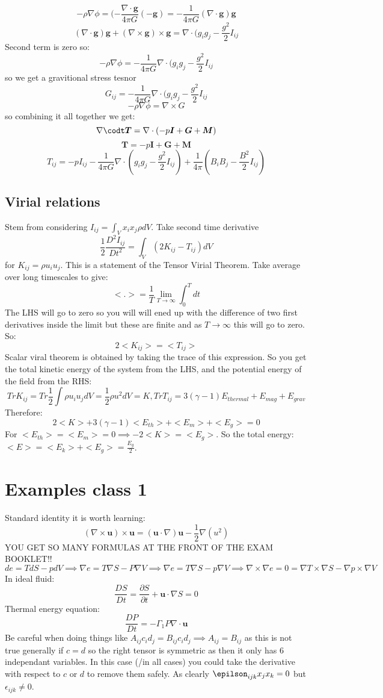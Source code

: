 \documentclass{article}
\begin{document}
$$
-\rho \nabla \phi = (- \frac{\nabla \cdot \bm g}{4 \pi G} (- \bm g) = -\frac{1}{4\pi G} (\nabla \cdot \bm g) \bm g
$$
$$
(\nabla \cdot \bm g) \bm g + (\nabla \times \bm g )\times \bm g = \nabla \cdot (g_i g_j - \frac{g^2}{2} I_{ij}
$$
Second term is zero so:
$$
- \rho \nabla \phi = - \frac{1}{4\pi G} \nabla \cdot(g_i g_j - \frac{g^2}{2} I_{ij} 
$$
so we get a gravitional stress tesnor
$$
G_{ij} = - \frac{1}{4\pi G} \nabla \cdot(g_i g_j - \frac{g^2}{2} I_{ij} 
$$
$$
-\rho \nabla \phi = \nabla \times G
$$
so combining it all together we get:
$$
\nabla \codt \bm T = \nabla \cdot (- p \bm I + \bm G + \bm M)
$$
$$
\bm T = - p \bm I + \bm G + \bm M
$$
\begin{equation}
        T_{ij} = -p I_{ij} -\frac{1}{4\pi G} \nabla \cdot(g_i g_j - \frac{g^2}{2} I_{ij})  + \frac{1}{4 \pi} (B_i B_j - \frac{B^2}{2} I_{ij})
\end{equation}
\subsection{Virial relations}
Stem from considering $I_{ij} = \int_V x_i x_j \rho dV$. Take second time derivative
$$
\frac{1}{2}\frac{D^2 I_{ij}}{Dt^2}= \int_V (2K_{ij} - T_{ij}) dV
$$
for $K_{ij} = \rho u_i u_j$. This is a statement of the Tensor Virial Theorem. Take average over long timescales to give:
$$
<.> = \frac{1}{T} \lim_{T\rightarrow \infty} \int^T_0 dt
$$
The LHS will go to zero so you will will ened up with the difference of two first derivatives inside the limit but these are finite and as $T\rightarrow \infty$ this will go to zero. So:
$$
2<K_{ij}> = <T_{ij}>
$$
Scalar viral theorem is obtained by taking the trace of this expression. So you get the total kinetic energy of the system from the LHS, and the potential energy of the field from the RHS:
$$
Tr K_{ij} = Tr \frac{1}{2} \int \rho u_i u_j dV = \frac{1}{2} \rho u^2 dV = K, Tr T_{ij} = 3(\gamma -1) E_{thermal} + E_{mag} + E_{grav}
$$
Therefore:
$$
2<K> + 3(\gamma -1) <E_{th}> + <E_m> + <E_g> = 0
$$
For $<E_{th}> = <E_m> =0 \implies -2<K> = <E_g>$. So the total energy: $<E> = <E_k> + <E_g> = \frac{E_g}{2}$.
\section{Examples class 1}
Standard identity it is worth learning:
$$
(\nabla \times \bm u) \times \bm u = (\bm u \cdot \nabla) \bm u - \frac{1}{2} \nabla (u^2)
$$
YOU GET SO MANY FORMULAS AT THE FRONT OF THE EXAM BOOKLET!!
$$
de = TdS - p dV \implies \nabla e = T \nabla S - P \nabla V \implies \nabla e = T \nabla S - p \nabla V \implies \nabla \times \nabla e = 0 = \nabla T \times \nabla S - \nabla p \times \nabla V 
$$
In ideal fluid:
$$
\frac{DS}{Dt} = \frac{\partial S}{\partial t} + \bm u \cdot \nabla S =0
$$
Thermal energy equation:
$$
 \frac{DP}{Dt} = - \Gamma_1 P \nabla \cdot \bm u
$$
Be careful when doing things like $A_{ij}c_id_j = B_{ij}c_id_j \implies A_{ij}=B_{ij}$ as this is not true generally if $c = d$ so the right tensor is symmetric as then it only has 6 independant variables. In this case (/in all cases) you could take the derivative with respect to $c$ or $d$ to remove them safely. As clearly $\epilson_{ijk}x_jx_k = 0$ but $\epsilon_{ijk} \neq 0$.
\end{document}
